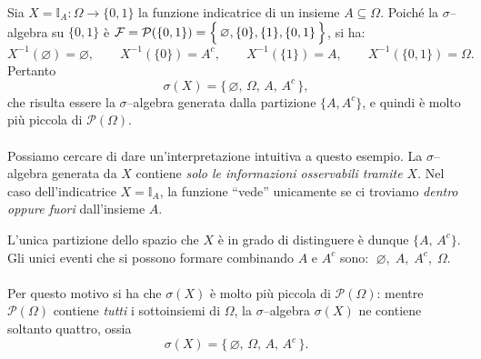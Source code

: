 \begin{esempio}
Sia $X = \mathbb{I}_A : \Omega \to \{0,1\}$ la funzione indicatrice di un insieme $A \subseteq \Omega$.
Poiché la $\sigma$--algebra su $\{0,1\}$ è $\mathcal{F} = \mathcal{P}(\{0,1\}) = \Bigl\{\,\varnothing, \{0\}, \{1\}, \{0,1\}\,\Bigr\}$,
si ha:
\[
X^{-1}(\varnothing) = \varnothing, \qquad
X^{-1}(\{0\}) = A^c, \qquad
X^{-1}(\{1\}) = A, \qquad
X^{-1}(\{0,1\}) = \Omega.
\]
Pertanto
\[
\sigma(X) = \{\, \varnothing,\, \Omega,\, A,\, A^c \,\},
\]
che risulta essere la $\sigma$--algebra generata dalla partizione $\{A, A^c\}$,
e quindi è molto più piccola di $\mathcal{P}(\Omega)$.\\
\\
Possiamo cercare di dare un'interpretazione intuitiva a questo esempio. La $\sigma$--algebra generata da $X$ contiene \emph{solo le informazioni osservabili tramite $X$}.
Nel caso dell'indicatrice $X = \mathbb{I}_A$, la funzione ``vede'' unicamente se ci troviamo
\emph{dentro oppure fuori} dall'insieme $A$.
\medskip

L'unica partizione dello spazio che $X$ è in grado di distinguere è dunque
\(
\{A,\, A^c\}
\). 
Gli unici eventi che si possono formare combinando $A$ e $A^c$ sono:
\(
\;\varnothing, \; A, \; A^c, \; \Omega.
\)\\
\\
Per questo motivo si ha che $\sigma(X)$ è molto più piccola di $\mathcal{P}(\Omega)$:
mentre $\mathcal{P}(\Omega)$ contiene \emph{tutti} i sottoinsiemi di $\Omega$,
la $\sigma$--algebra $\sigma(X)$ ne contiene soltanto quattro, ossia
\[
\sigma(X) = \{\, \varnothing,\, \Omega,\, A,\, A^c \,\}.
\]
\end{esempio}


